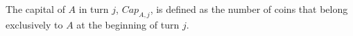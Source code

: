 {}
\begin{definition}[Capital]
  The capital of $A$ in turn $j$, $Cap_{A, j}$, is defined as the number of coins that belong exclusively to $A$ at the
  beginning of turn $j$.
\end{definition}
